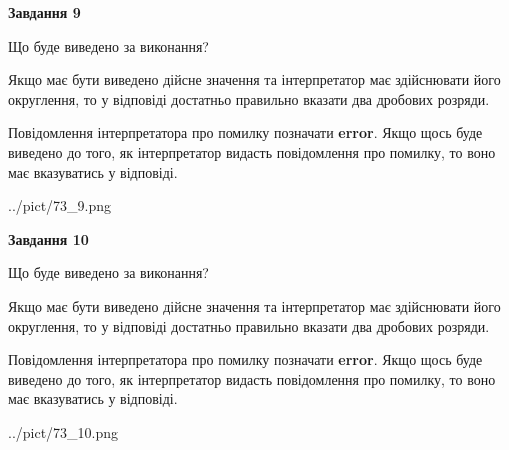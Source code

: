 \documentclass[12pt, ukrainian]{article}
\begin{document}
{\begin {Large}
{\begin {center}\textbf{Завдання 9}\end {center}}\par
Що буде виведено за виконання? \par

Якщо має бути виведено дійсне значення та інтерпретатор має здійснювати його округлення, 
то у відповіді достатньо правильно вказати два дробових розряди.

Повідомлення інтерпретатора про помилку позначати \textbf{error}.
Якщо щось буде виведено до того, як інтерпретатор видасть повідомлення про помилку, 
то воно має вказуватись у відповіді. \par

\begin{center}
	{../pict/73_9.png}
\end{center}
\newpage

{\begin {center}\textbf{Завдання 10}\end {center}}\par
Що буде виведено за виконання? \par

Якщо має бути виведено дійсне значення та інтерпретатор має здійснювати його округлення, 
то у відповіді достатньо правильно вказати два дробових розряди.

Повідомлення інтерпретатора про помилку позначати \textbf{error}.
Якщо щось буде виведено до того, як інтерпретатор видасть повідомлення про помилку, 
то воно має вказуватись у відповіді. \par

\begin{center}
	{../pict/73_10.png}
\end{center}
\newpage

\end {Large}}
\end{document}
